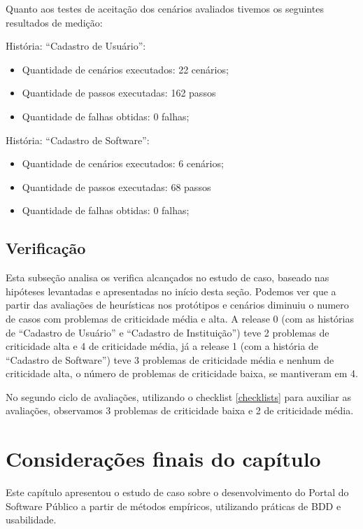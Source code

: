 \newpage
Quanto aos testes de aceitação dos cenários avaliados tivemos os seguintes resultados de medição:

História: ``Cadastro de Usuário'':
\begin{itemize}
	\item Quantidade de cenários executados: 22 cenários;
	\item Quantidade de passos executadas: 162 passos
	\item Quantidade de falhas obtidas: 0 falhas;
\end{itemize} 

História: ``Cadastro de Software'':
\begin{itemize}
	\item Quantidade de cenários executados: 6 cenários;
	\item Quantidade de passos executadas: 68 passos
	\item Quantidade de falhas obtidas: 0 falhas;
\end{itemize} 

\subsection{Verificação}

Esta subseção analisa os verifica alcançados no estudo de caso, baseado nas hipóteses levantadas e apresentadas no início desta seção. Podemos ver que a partir das avaliações de heurísticas nos protótipos e cenários diminuiu o numero de casos com problemas de criticidade média e alta. A release 0 (com as histórias de ``Cadastro de Usuário'' e ``Cadastro de Instituição'') teve 2 problemas de criticidade alta e 4 de criticidade média, já a release 1 (com a história de ``Cadastro de Software'') teve 3 problemas de criticidade média e nenhum de criticidade alta, o número de problemas de criticidade baixa, se mantiveram em 4.

No segundo ciclo de avaliações, utilizando o checklist \ref{checklists} para auxiliar as avaliações, observamos 3 problemas de criticidade baixa e 2 de criticidade média.



\section{Considerações finais do capítulo}

Este capítulo apresentou o estudo de caso sobre o desenvolvimento do Portal do Software Público a partir de métodos empíricos, utilizando práticas de BDD e usabilidade.







